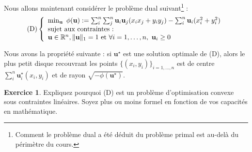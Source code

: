 \documentclass[a4paper,francais]{article}
\newcommand{\R}{{\ensuremath\mathbb{R}}}
\theoremstyle{definition}
\newtheorem{exercice}{Exercice}[section]
\newtheorem*{solution}{Solution}
\let\vec\mathbf
\begin{document}
Nous allons maintenant considérer le problème dual suivant\footnote{Comment le problème dual a été
  déduit du problème primal est au-delà du périmètre du cours.} :
\[
\text{(D)}
\left\{
\begin{array}{l}
  \min_{\vec{u}} \ \phi(\vec{u}) :=
  \sum_i^n\sum_j^n \vec{u}_i\vec{u}_j (x_ix_j + y_iy_j) - \sum_i^n \vec{u}_i (x_i^2 + y_i^2) \\
  \text{sujet aux contraintes :} \\
  \vec{u} \in \R^n, \|\vec{u}\|_1 = 1 \ \text{et} \ \forall i = 1, \dots, n, \  \vec{u}_i \geq 0 \\
\end{array}
\right.
\]

Nous avons la propriété suivante : si $\vec{u}^\star$ est une solution optimale de (D),
alors le plus petit disque recouvrant les points $\{(x_i, y_i)\}_{i = 1, \dots, n}$ est
de centre $\sum_i^n \vec{u}^\star_i (x_i, y_i)$ et de rayon $\sqrt{-\phi(\vec{u}^\star)}$. 

\begin{exercice}
  Expliquez pourquoi (D) est un problème d'optimisation convexe sous contraintes linéaires.
  Soyez plus ou moins formel en fonction de vos capacités en mathématique. 
\end{exercice}




\end{document}
